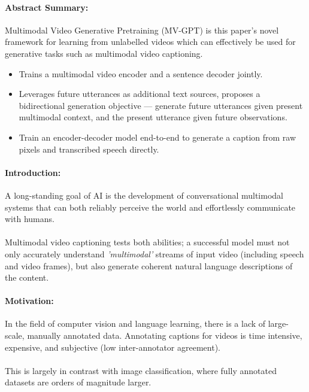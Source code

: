 \documentclass{article}
\begin{document}
\paragraph{Abstract Summary:} Multimodal Video Generative Pretraining (MV-GPT) is this paper's
novel framework for learning from unlabelled videos which can effectively be used for generative
tasks such as multimodal video captioning.

\begin{itemize}
    \item Trains a multimodal video encoder and a sentence decoder jointly.
    \item Leverages future utterances as additional text sources, proposes a bidirectional
        generation objective --- generate future utterances given present multimodal context,
        and the present utterance given future observations.
    \item Train an encoder-decoder model end-to-end to generate a caption from raw pixels and
        transcribed speech directly.
\end{itemize}

\paragraph{Introduction:} A long-standing goal of AI is the development of conversational multimodal
systems that can both reliably perceive the world and effortlessly communicate with humans. 

\paragraph{}Multimodal video captioning tests both abilities; a successful model must not only accurately
understand \emph{'multimodal'} streams of input video (including speech and video frames), but also 
generate coherent natural language descriptions of the content.

\paragraph{Motivation:}In the field of computer vision and language learning, there is a lack of
large-scale, manually annotated data. Annotating captions for videos is time intensive, expensive,
and subjective (low inter-annotator agreement).

\paragraph{}This is largely in contrast with image classification, where fully annotated datasets are
orders of magnitude larger.
\end{document}
